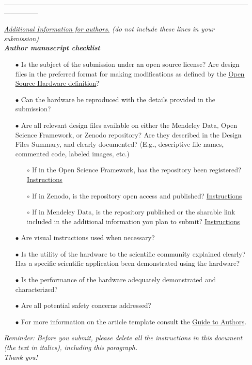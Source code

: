 \documentclass[11pt, letterpaper]{article}
\begin{document}
\begin{center}
---------------------------------------------------------------------------------------------------------------------------
\end{center}
{\it \underline{Additional Information for authors.} (do not include these lines in your submission)\\

\noindent
\textbf{Author manuscript checklist}
\begin{itemize}
\item[$\bullet$]Is the subject of the submission under an open source license? Are design files in the preferred format for making modifications as defined by the \href{http://www.oshwa.org/definition/}{\underline{Open Source Hardware definition}}?

\item[$\bullet$]Can the hardware be reproduced with the details provided in the submission?

\item[$\bullet$]Are all relevant design files available on either the Mendeley Data, Open Science Framework, or Zenodo repository? Are they described in the Design Files Summary, and clearly documented? (E.g., descriptive file names, commented code, labeled images, etc.) 
\begin{itemize}
\item[$\circ$]If in the Open Science Framework, has the repository been registered? \href{https://osf.io/wgk7q/wiki/home/}{\underline{Instructions}}
\item[$\circ$]If in Zenodo, is the repository open access and published? \href{https://doi.org/10.5281/zenodo.3346799}{\underline{Instructions}}
\item[$\circ$]If in Mendeley Data, is the repository published or the sharable link included in the additional information you plan to submit? \href{https://doi.org/10.5281/zenodo.3346799}{\underline{Instructions}}
\end{itemize}
\item[$\bullet$]Are visual instructions used when necessary?

\item[$\bullet$]Is the utility of the hardware to the scientific community explained clearly? Has a specific scientific application been demonstrated using the hardware?

\item[$\bullet$]Is the performance of the hardware adequately demonstrated and characterized?

\item[$\bullet$]Are all potential safety concerns addressed?

\item[$\bullet$]For more information on the article template consult the \href{https://www.elsevier.com/journals/hardwarex/2468-0672/guide-for-authors}{\underline{Guide to Authors}}.
\end{itemize}}

\vskip 1.5cm
\begin{center}
{\Huge \it Reminder: Before you submit, please delete all 
the instructions in this document (the text in italics), including this paragraph.\\
Thank you!}
\end{center}
\end{document}
